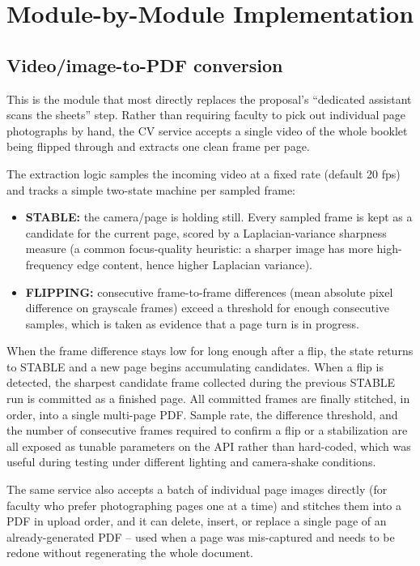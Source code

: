 \documentclass[11pt,a4paper]{article}
\begin{document}
\section{Module-by-Module Implementation}

\subsection{Video/image-to-PDF conversion}

This is the module that most directly replaces the proposal's ``dedicated
assistant scans the sheets'' step. Rather than requiring faculty to pick out
individual page photographs by hand, the CV service accepts a single video of
the whole booklet being flipped through and extracts one clean frame per
page.

The extraction logic samples the incoming video at a fixed rate
(default 20 fps) and tracks a simple two-state machine per sampled frame:

\begin{itemize}[leftmargin=0.7cm]
  \item \textbf{STABLE:} the camera/page is holding still. Every sampled frame
    is kept as a candidate for the current page, scored by a Laplacian-variance
    sharpness measure (a common focus-quality heuristic: a sharper image has
    more high-frequency edge content, hence higher Laplacian variance).
  \item \textbf{FLIPPING:} consecutive frame-to-frame differences (mean
    absolute pixel difference on grayscale frames) exceed a threshold for
    enough consecutive samples, which is taken as evidence that a page turn is
    in progress.
\end{itemize}

When the frame difference stays low for long enough after a flip, the state
returns to STABLE and a new page begins accumulating candidates. When a flip
is detected, the sharpest candidate frame collected during the previous
STABLE run is committed as a finished page. All committed frames are finally
stitched, in order, into a single multi-page PDF. Sample rate, the
difference threshold, and the number of consecutive frames required to
confirm a flip or a stabilization are all exposed as tunable parameters on
the API rather than hard-coded, which was useful during testing under
different lighting and camera-shake conditions.

The same service also accepts a batch of individual page images directly
(for faculty who prefer photographing pages one at a time) and stitches them
into a PDF in upload order, and it can delete, insert, or replace a single
page of an already-generated PDF -- used when a page was mis-captured and
needs to be redone without regenerating the whole document.
\end{document}
